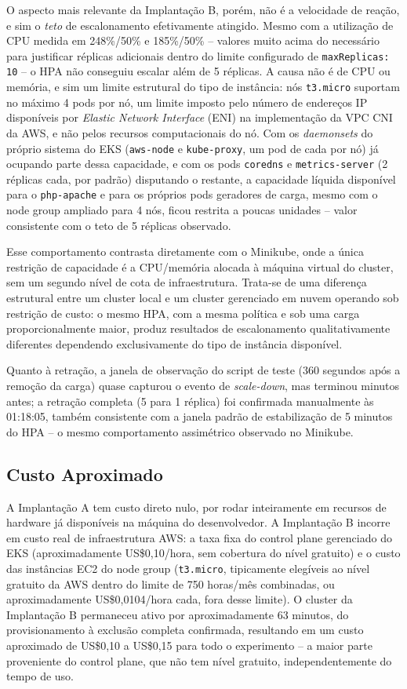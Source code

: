 \documentclass[12pt]{article}
\begin{document}
O aspecto mais relevante da Implantação B, porém, não é a velocidade de
reação, e sim o \emph{teto} de escalonamento efetivamente atingido. Mesmo
com a utilização de CPU medida em 248\%/50\% e 185\%/50\% -- valores muito
acima do necessário para justificar réplicas adicionais dentro do limite
configurado de \texttt{maxReplicas: 10} -- o HPA não conseguiu escalar além
de 5 réplicas. A causa não é de CPU ou memória, e sim um limite estrutural
do tipo de instância: nós \texttt{t3.micro} suportam no máximo 4 pods por
nó, um limite imposto pelo número de endereços IP disponíveis por
\emph{Elastic Network Interface} (ENI) na implementação da VPC CNI da AWS,
e não pelos recursos computacionais do nó. Com os \emph{daemonsets} do
próprio sistema do EKS (\texttt{aws-node} e \texttt{kube-proxy}, um pod de
cada por nó) já ocupando parte dessa capacidade, e com os pods
\texttt{coredns} e \texttt{metrics-server} (2 réplicas cada, por padrão)
disputando o restante, a capacidade líquida disponível para o
\texttt{php-apache} e para os próprios pods geradores de carga, mesmo com o
node group ampliado para 4 nós, ficou restrita a poucas unidades -- valor
consistente com o teto de 5 réplicas observado.

Esse comportamento contrasta diretamente com o Minikube, onde a única
restrição de capacidade é a CPU/memória alocada à máquina virtual do
cluster, sem um segundo nível de cota de infraestrutura. Trata-se de uma
diferença estrutural entre um cluster local e um cluster gerenciado em
nuvem operando sob restrição de custo: o mesmo HPA, com a mesma política e
sob uma carga proporcionalmente maior, produz resultados de escalonamento
qualitativamente diferentes dependendo exclusivamente do tipo de instância
disponível.

Quanto à retração, a janela de observação do script de teste (360 segundos
após a remoção da carga) quase capturou o evento de \emph{scale-down}, mas
terminou minutos antes; a retração completa (5 para 1 réplica) foi
confirmada manualmente às 01:18:05, também consistente com a janela padrão
de estabilização de 5 minutos do HPA -- o mesmo comportamento assimétrico
observado no Minikube.

\subsection{Custo Aproximado}

A Implantação A tem custo direto nulo, por rodar inteiramente em recursos
de hardware já disponíveis na máquina do desenvolvedor. A Implantação B
incorre em custo real de infraestrutura AWS: a taxa fixa do control plane
gerenciado do EKS (aproximadamente US\$0,10/hora, sem cobertura do nível
gratuito) e o custo das instâncias EC2 do node group (\texttt{t3.micro},
tipicamente elegíveis ao nível gratuito da AWS dentro do limite de 750
horas/mês combinadas, ou aproximadamente US\$0,0104/hora cada, fora desse
limite). O cluster da Implantação B permaneceu ativo por aproximadamente 63
minutos, do provisionamento à exclusão completa confirmada, resultando em
um custo aproximado de US\$0,10 a US\$0,15 para todo o experimento -- a
maior parte proveniente do control plane, que não tem nível gratuito,
independentemente do tempo de uso.
\end{document}
